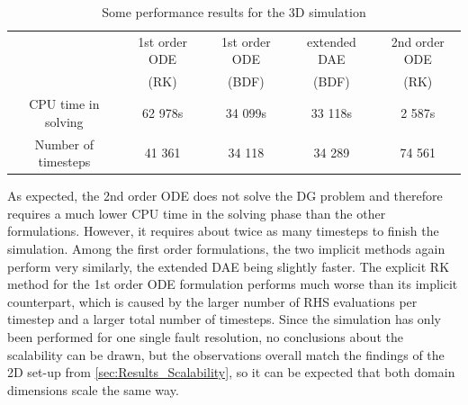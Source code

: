 \begin{table}[H]
	\centering 
	\begin{tabular}{ | c | c c c c |}
		\hline	
		& 1st order ODE 	& 1st order ODE 	& extended DAE  & 2nd order ODE  	\\ 
		& (RK)				& (BDF) 			&  (BDF) 		& (RK) 		  	 	\\ \hline
		CPU time in solving
		& 62 978s 			& 34 099s			& 33 118s 		& 2 587s			  	\\  
		Number of timesteps 	
		& 41 361 		 	& 34 118			& 34 289		& 74 561				\\\hline
	\end{tabular}
	\caption{Some performance results for the 3D simulation}
	\label{tab:performance_3D}
\end{table}

As expected, the 2nd order ODE does not solve the DG problem and therefore requires a much lower CPU time in the solving phase than the other formulations. However, it requires about twice as many timesteps to finish the simulation. Among the first order formulations, the two implicit methods again perform very similarly, the extended DAE being slightly faster. The explicit RK method for the 1st order ODE formulation performs much worse than its implicit counterpart, which is caused by the larger number of RHS evaluations per timestep and a larger total number of timesteps. Since the simulation has only been performed for one single fault resolution, no conclusions about the scalability can be drawn, but the observations overall match the findings of the 2D set-up from \autoref{sec:Results_Scalability}, so it can be expected that both domain dimensions scale the same way. 






